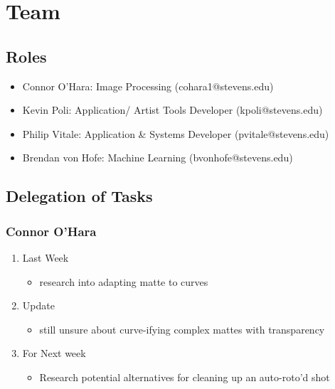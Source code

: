 \documentclass[15pt]{article}
\begin{document}
\section{Team}
\label{sec:org9a20625}
\subsection{Roles}
\label{sec:org69d7b8f}
\begin{itemize}
\item Connor O’Hara: Image Processing (cohara1@stevens.edu)
\item Kevin Poli: Application/ Artist Tools Developer (kpoli@stevens.edu)
\item Philip Vitale: Application \& Systems Developer (pvitale@stevens.edu)
\item Brendan von Hofe: Machine Learning (bvonhofe@stevens.edu)
\end{itemize}



\subsection{Delegation of Tasks}
\label{sec:org65bd09b}

\subsubsection{Connor O’Hara}
\label{sec:org6158cc1}
\begin{enumerate}
\item Last Week
\label{sec:org54492d6}
\begin{itemize}
\item research into adapting matte to curves
\end{itemize}
\item Update
\label{sec:org5906e47}
\begin{itemize}
\item still unsure about curve-ifying complex mattes with transparency
\end{itemize}
\item For Next week
\label{sec:org0adf186}
\begin{itemize}
\item Research potential alternatives for cleaning up an auto-roto'd shot
\end{itemize}
\end{enumerate}
\end{document}

